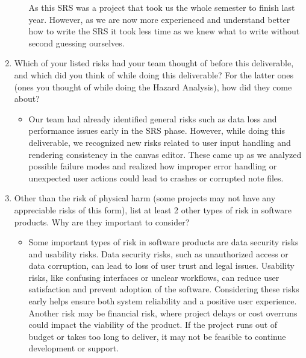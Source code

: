 \documentclass{article}
\begin{document}
\begin{enumerate}
\begin{itemize}
        As this SRS was a project that took us the whole semester to finish last year. 
        However, as we are now more experienced and understand better how to write the 
        SRS it took less time as we knew what to write without second guessing 
        ourselves.
    \end{itemize} 
    \item Which of your listed risks had your team thought of before this
    deliverable, and which did you think of while doing this deliverable? For
    the latter ones (ones you thought of while doing the Hazard Analysis), how
    did they come about?
    \begin{itemize}
        \item Our team had already identified general risks such as 
        data loss and performance issues early in the SRS phase. However, while 
        doing this deliverable, we recognized new risks related to user input 
        handling and rendering consistency in the canvas editor. These came up 
        as we analyzed possible failure modes and realized how improper error 
        handling or unexpected user actions could lead to crashes or corrupted note files. 
    \end{itemize} 
    \item Other than the risk of physical harm (some projects may not have any
    appreciable risks of this form), list at least 2 other types of risk in
    software products. Why are they important to consider?
    \begin{itemize}
        \item Some important types of risk in software products are data security 
        risks and usability risks. Data security risks, such as unauthorized access or data 
        corruption, can lead to loss of user trust and legal issues. Usability risks, like 
        confusing interfaces or unclear workflows, can reduce user satisfaction and prevent 
        adoption of the software. Considering these risks early helps ensure both system 
        reliability and a positive user experience. Another risk may be financial risk, 
        where project delays or cost overruns could impact the viability of the product.
        If the project runs out of budget or takes too long to deliver, it may not be
        feasible to continue development or support.
    \end{itemize} 
\end{enumerate}
\end{document}
